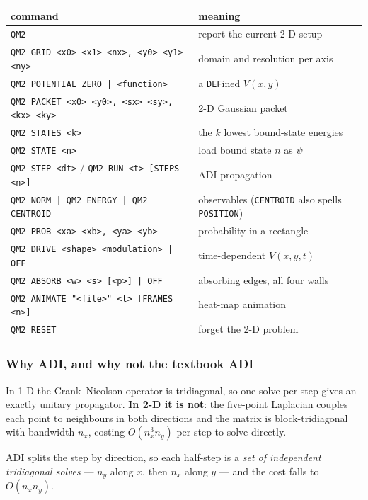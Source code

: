 \documentclass[11pt]{article}
\newcommand{\kw}[1]{\texttt{\uppercase{#1}}}
\newcommand{\code}[1]{\texttt{#1}}
\begin{document}
\begin{center}
\begin{tabular}{lp{7.2cm}}
\textbf{command} & \textbf{meaning}\\
\hline
\code{QM2} & report the current 2-D setup\\
\code{QM2 GRID <x0> <x1> <nx>, <y0> <y1> <ny>} & domain and resolution per axis\\
\code{QM2 POTENTIAL ZERO | <function>} & a \kw{def}ined $V(x,y)$\\
\code{QM2 PACKET <x0> <y0>, <sx> <sy>, <kx> <ky>} & 2-D Gaussian packet\\
\code{QM2 STATES <k>} & the $k$ lowest bound-state energies\\
\code{QM2 STATE <n>} & load bound state $n$ as $\psi$\\
\code{QM2 STEP <dt>} / \code{QM2 RUN <t> [STEPS <n>]} & ADI propagation\\
\code{QM2 NORM | QM2 ENERGY | QM2 CENTROID} & observables (\code{CENTROID} also spells \code{POSITION})\\
\code{QM2 PROB <xa> <xb>, <ya> <yb>} & probability in a rectangle\\
\code{QM2 DRIVE <shape> <modulation> | OFF} & time-dependent $V(x,y,t)$\\
\code{QM2 ABSORB <w> <s> [<p>] | OFF} & absorbing edges, all four walls\\
\code{QM2 ANIMATE "<file>" <t> [FRAMES <n>]} & heat-map animation\\
\code{QM2 RESET} & forget the 2-D problem\\
\end{tabular}
\end{center}

\subsubsection*{Why ADI, and why not the textbook ADI}

In 1-D the Crank--Nicolson operator is tridiagonal, so one solve per step
gives an exactly unitary propagator. \textbf{In 2-D it is not}: the
five-point Laplacian couples each point to neighbours in both directions
and the matrix is block-tridiagonal with bandwidth $n_x$, costing
$O(n_x^3 n_y)$ per step to solve directly.

ADI splits the step by direction, so each half-step is a \emph{set of
independent tridiagonal solves} --- $n_y$ along $x$, then $n_x$ along
$y$ --- and the cost falls to $O(n_x n_y)$.
\end{document}
